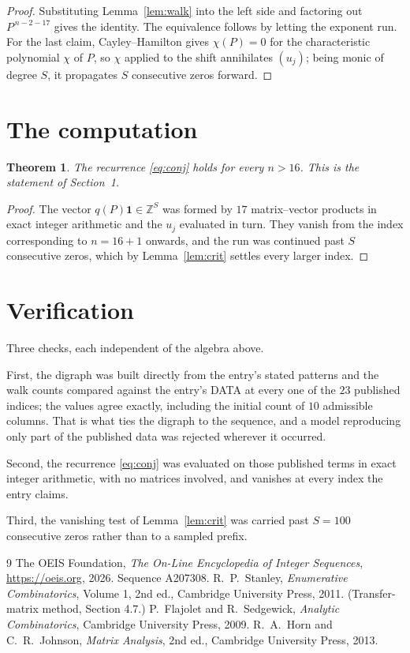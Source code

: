 \documentclass[11pt,a4paper]{article}
\theoremstyle{plain}
\newtheorem{theorem}{Theorem}
\theoremstyle{definition}
\begin{document}
\begin{proof}
Substituting Lemma~\ref{lem:walk} into the left side and factoring out
$P^{\,n-2-17}$ gives the identity. The equivalence follows by letting the exponent
run. For the last claim, Cayley--Hamilton gives $\chi(P)=0$ for the characteristic
polynomial $\chi$ of $P$, so $\chi$ applied to the shift annihilates $(u_j)$; being monic of
degree $S$, it propagates $S$ consecutive zeros forward.
\end{proof}

\section{The computation}

\begin{theorem}
The recurrence \eqref{eq:conj} holds for every $n>16$. This is the statement of
Section~1.
\end{theorem}

\begin{proof}
The vector $q(P)\mathbf{1}\in\mathbb{Z}^{S}$ was formed by $17$ matrix--vector
products in exact integer arithmetic and the $u_j$ evaluated in turn. They vanish from the
index corresponding to $n=16+1$ onwards, and the run was continued past $S$ consecutive
zeros, which by Lemma~\ref{lem:crit} settles every larger index.
\end{proof}

\section{Verification}

Three checks, each independent of the algebra above.

First, the digraph was built directly from the entry's stated patterns and the walk counts
compared against the entry's DATA at every one of the $23$ published indices; the
values agree exactly, including the initial count of $10$ admissible columns. That is
what ties the digraph to the sequence, and a model reproducing only part of the published
data was rejected wherever it occurred.

Second, the recurrence \eqref{eq:conj} was evaluated on those published terms in exact
integer arithmetic, with no matrices involved, and vanishes at every index the entry claims.

Third, the vanishing test of Lemma~\ref{lem:crit} was carried past $S=100$ consecutive
zeros rather than to a sampled prefix.

\begin{thebibliography}{9}
 The OEIS Foundation, \emph{The On-Line Encyclopedia of Integer
Sequences}, \url{https://oeis.org}, 2026. Sequence A207308.
 R.~P.~Stanley, \emph{Enumerative Combinatorics}, Volume 1, 2nd ed.,
Cambridge University Press, 2011. (Transfer-matrix method, Section 4.7.)
 P.~Flajolet and R.~Sedgewick, \emph{Analytic Combinatorics}, Cambridge
University Press, 2009.
 R.~A.~Horn and C.~R.~Johnson, \emph{Matrix Analysis}, 2nd ed., Cambridge
University Press, 2013.
\end{thebibliography}
\end{document}
